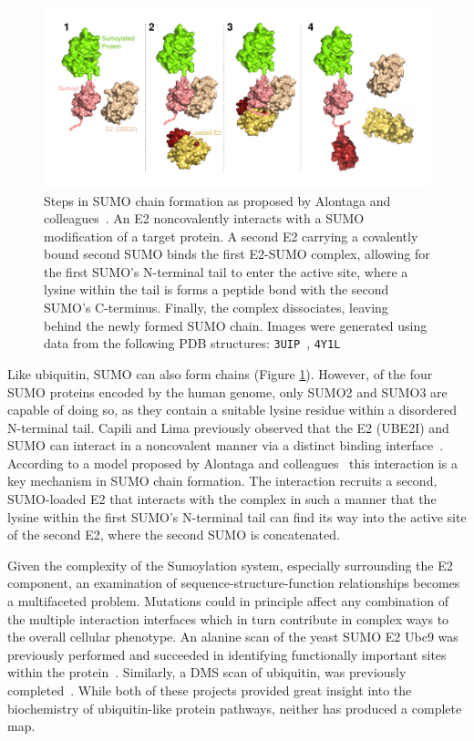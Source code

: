 \begin{figure}[h!]
	\centering
	\includegraphics[width=\textwidth]{img/sumo_chaining.pdf}
	\caption{Steps in SUMO chain formation as proposed by Alontaga and colleagues~\cite{alontaga_rwd_2015}. An E2 noncovalently interacts with a SUMO modification of a target protein. A second E2 carrying a covalently bound second SUMO binds the first E2-SUMO complex, allowing for the first SUMO's N-terminal tail to enter the active site, where a lysine within the tail is forms a peptide bond with the second SUMO's C-terminus. Finally, the complex dissociates, leaving behind the newly formed SUMO chain. Images were generated using data from the following PDB structures: \texttt{3UIP}~\cite{gareau_determinants_2012}, \texttt{4Y1L}~\cite{alontaga_rwd_2015}}
	\label{fig:sumo_chaining}
\end{figure}

Like ubiquitin, SUMO can also form chains (Figure \ref{fig:sumo_chaining}). However, of the four SUMO proteins encoded by the human genome, only SUMO2 and SUMO3 are capable of doing so, as they contain a suitable lysine residue within a disordered N-terminal tail. Capili and Lima previously observed that the E2 (UBE2I) and SUMO can interact in a noncovalent manner via a distinct binding interface~\cite{capili_structure_2007}. According to a model proposed by Alontaga and colleagues~\cite{alontaga_rwd_2015} this interaction is a key mechanism in SUMO chain formation. The interaction recruits a second, SUMO-loaded E2 that interacts with the complex in such a manner that the lysine within the first SUMO's N-terminal tail can find its way into the active site of the second E2, where the second SUMO is concatenated.



Given the complexity of the Sumoylation system, especially surrounding the E2 component, an examination of sequence-structure-function relationships becomes a multifaceted problem. Mutations could in principle affect any combination of the multiple interaction interfaces which in turn contribute in complex ways to the overall cellular phenotype.
An alanine scan of the yeast SUMO E2 Ubc9 was previously performed and succeeded in identifying functionally important sites within the protein~\cite{20}. Similarly, a DMS scan of ubiquitin, was previously completed~\cite{21}. While both of these projects provided great insight into the biochemistry of ubiquitin-like protein pathways, neither has produced a complete map.
